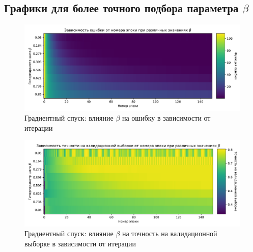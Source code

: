 \documentclass{article}
\begin{document}
        \subsection{Графики для более точного подбора параметра $\beta$}
            \begin{figure}[H]
                \centering
                \includegraphics[width=0.8\linewidth]{./pictures/GDbetas_func2.pdf}
                \caption{Градиентный спуск: влияние $\beta$ на ошибку в зависимости от итерации}
                \label{fig:11}
            \end{figure}
            \begin{figure}[H]
                \centering
                \includegraphics[width=0.8\linewidth]{./pictures/GDbetas_val_accuracy2.pdf}
                \caption{Градиентный спуск: влияние $\beta$ на точность на валидационной выборке в зависимости от итерации}
                \label{fig:12}
            \end{figure}


                
\end{document}
